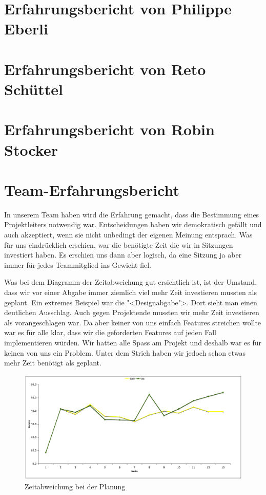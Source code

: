 \documentclass[12pt,halfparskip]{scrartcl}
\begin{document}
\section{Erfahrungsbericht von Philippe Eberli}

\section{Erfahrungsbericht von Reto Schüttel}

\section{Erfahrungsbericht von Robin Stocker}

\section{Team-Erfahrungsbericht}
In unserem Team haben wird die Erfahrung gemacht, dass die Bestimmung eines Projektleiters notwendig war. Entscheidungen haben wir demokratisch gefällt und auch akzeptiert, wenn sie nicht unbedingt der eigenen Meinung entsprach. Was für uns eindrücklich erschien, war die benötigte Zeit die wir in Sitzungen investiert haben. Es erschien uns dann aber logisch, da eine Sitzung ja aber immer für jedes Teammitglied ins Gewicht fiel.

Was bei dem Diagramm der Zeitabweichung gut ersichtlich ist, ist der Umstand, dass wir vor einer Abgabe immer ziemlich viel mehr Zeit investieren mussten als geplant. Ein extremes Beispiel war die "<Designabgabe">. Dort sieht man einen deutlichen Ausschlag. Auch gegen Projektende mussten wir mehr Zeit investieren als vorangeschlagen war. Da aber keiner von uns einfach Features streichen wollte war es für alle klar, dass wir die geforderten Features auf jeden Fall implementieren würden. Wir hatten alle Spass am Projekt und deshalb war es für keinen von uns ein Problem. Unter dem Strich haben wir jedoch schon etwas mehr Zeit benötigt als geplant.

\begin{figure}[h]
	\centering
	\includegraphics[width=0.8 \textwidth]{zeitabweichung}
	\caption{Zeitabweichung bei der Planung}
	\label{fig:zeitabweichung}
\end{figure}
\end{document}
